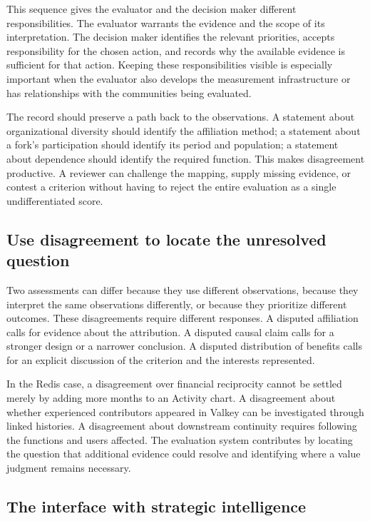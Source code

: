 This sequence gives the evaluator and the decision maker different responsibilities. The evaluator warrants the evidence and the scope of its interpretation. The decision maker identifies the relevant priorities, accepts responsibility for the chosen action, and records why the available evidence is sufficient for that action. Keeping these responsibilities visible is especially important when the evaluator also develops the measurement infrastructure or has relationships with the communities being evaluated.

The record should preserve a path back to the observations. A statement about organizational diversity should identify the affiliation method; a statement about a fork's participation should identify its period and population; a statement about dependence should identify the required function. This makes disagreement productive. A reviewer can challenge the mapping, supply missing evidence, or contest a criterion without having to reject the entire evaluation as a single undifferentiated score.

\subsection{Use disagreement to locate the unresolved question}
Two assessments can differ because they use different observations, because they interpret the same observations differently, or because they prioritize different outcomes. These disagreements require different responses. A disputed affiliation calls for evidence about the attribution. A disputed causal claim calls for a stronger design or a narrower conclusion. A disputed distribution of benefits calls for an explicit discussion of the criterion and the interests represented.

In the Redis case, a disagreement over financial reciprocity cannot be settled merely by adding more months to an Activity chart. A disagreement about whether experienced contributors appeared in Valkey can be investigated through linked histories. A disagreement about downstream continuity requires following the functions and users affected. The evaluation system contributes by locating the question that additional evidence could resolve and identifying where a value judgment remains necessary.

\subsection{The interface with strategic intelligence}
\label{sec:ch9-intelligence}

